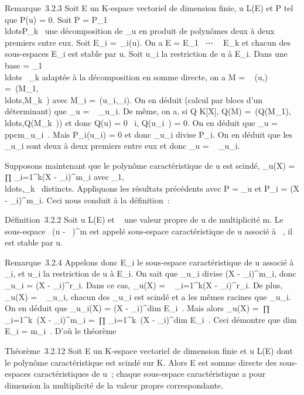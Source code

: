 \documentclass[]{article}
\begin{document}
Remarque~3.2.3 Soit E un K-espace vectoriel de dimension finie, u \in L(E)
et P tel que P(u) = 0. Soit P =
P_1\\ldotsP_k~
une décomposition de \chi_u en produit de polynômes deux à deux
premiers entre eux. Soit E_i =\
\mathrmKerP_i(u). On a E = E_1
\oplus~⋯ \oplus~ E_k et chacun des sous-espaces
E_i est stable par u. Soit u_i la restriction de u à
E_i. Dans une base  = \mathcal{E}_1
\cup\\ldots~
\cup{}_k adaptée à la décomposition en somme directe, on a M
= \mathrmMat~ (u,\mathcal{E})
=\
\mathrmdiag(M_1,\\ldots,M_k~)
avec M_i =\
\mathrmMat (u_i,_i). On en
déduit (calcul par blocs d'un déterminant) que \chi_u
= \∏ ~
\chi_u_i. De même, on a, si Q \in K[X], Q(M)
=\
\mathrmdiag(Q(M_1),\\ldots,Q(M_k~))
et donc Q(u) = 0 \Leftrightarrow
\forall~i, Q(u_i~) = 0. On en déduit que
\mu_u = ppcm\mu_u_i~.
Mais P_i(u_i) = 0 et donc \mu_u_i
divise P_i. On en déduit que les \mu_u_i sont
deux à deux premiers entre eux et donc \mu_u
= \∏ ~
\mu_u_i.

Supposons maintenant que le polynôme caractéristique de u est scindé,
\chi_u(X) = \\∏
 _i=1^k(X - \lambda_i)^m_i avec
\lambda_1,\\ldots,\lambda_k~
distincts. Appliquons les résultats précédents avec P = \chi_u et
P_i = (X - \lambda_i)^m_i. Ceci nous
conduit à la définition~:

Définition~3.2.2 Soit u \in L(E) et \lambda~ une valeur propre de u de
multiplicité m. Le sous-espace
\mathrmKer~(u -
\lambda~\mathrmId)^m est appelé sous-espace
caractéristique de u associé à \lambda~, il est stable par u.

Remarque~3.2.4 Appelons donc E_i le sous-espace caractéristique
de u associé à \lambda_i, et u_i la restriction de u à
E_i. On sait que \mu_u_i divise (X -
\lambda_i)^m_i, donc \mu_u_i = (X
- \lambda_i)^r_i. Dans ce cas, \mu_u(X)
= \∏ ~
_i=1^k(X - \lambda_i)^r_i. De plus,
\chi_u(X) = \∏ ~
\chi_u_i, chacun des \chi_u_i est scindé
et a les mêmes racines que \mu_u_i. On en déduit que
\chi_u_i(X) = (X -
\lambda_i)^dim E_i~. Mais
alors \chi_u(X) =\
∏  _i=1^k~(X -
\lambda_i)^m_i =\
∏ _i=1^k~(X -
\lambda_i)^dim E_i~. Ceci
démontre que dim E_i = m_i~.
D'où le théorème

Théorème~3.2.12 Soit E un K-espace vectoriel de dimension finie et u \in
L(E) dont le polynôme caractéristique est scindé sur K. Alors E est
somme directe des sous-espaces caractéristiques de u~; chaque
sous-espace caractéristique a pour dimension la multiplicité de la
valeur propre correspondante.
\end{document}
